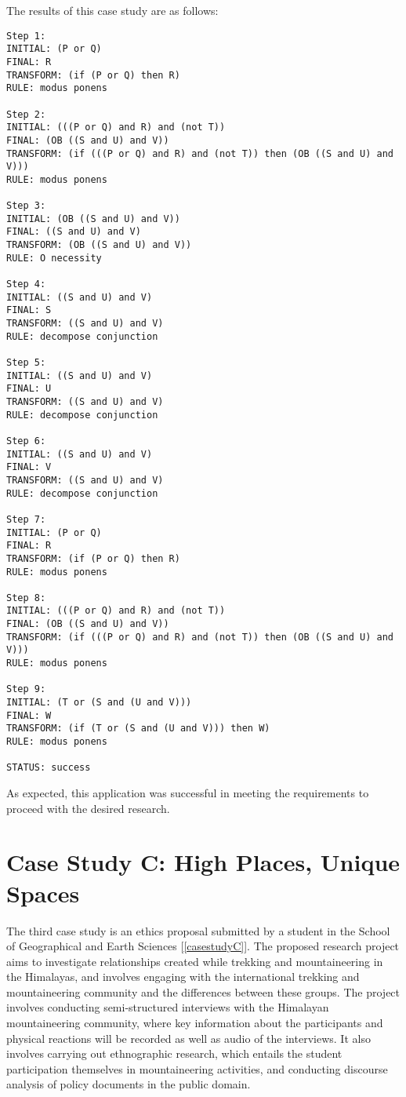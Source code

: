\documentclass{l4proj}
\begin{document}
The results of this case study are as follows: 
\begin{verbatim}
Step 1: 
INITIAL: (P or Q)
FINAL: R
TRANSFORM: (if (P or Q) then R)
RULE: modus ponens

Step 2: 
INITIAL: (((P or Q) and R) and (not T))
FINAL: (OB ((S and U) and V))
TRANSFORM: (if (((P or Q) and R) and (not T)) then (OB ((S and U) and V)))
RULE: modus ponens

Step 3: 
INITIAL: (OB ((S and U) and V))
FINAL: ((S and U) and V)
TRANSFORM: (OB ((S and U) and V))
RULE: O necessity

Step 4: 
INITIAL: ((S and U) and V)
FINAL: S
TRANSFORM: ((S and U) and V)
RULE: decompose conjunction

Step 5: 
INITIAL: ((S and U) and V)
FINAL: U
TRANSFORM: ((S and U) and V)
RULE: decompose conjunction

Step 6: 
INITIAL: ((S and U) and V)
FINAL: V
TRANSFORM: ((S and U) and V)
RULE: decompose conjunction

Step 7: 
INITIAL: (P or Q)
FINAL: R
TRANSFORM: (if (P or Q) then R)
RULE: modus ponens

Step 8: 
INITIAL: (((P or Q) and R) and (not T))
FINAL: (OB ((S and U) and V))
TRANSFORM: (if (((P or Q) and R) and (not T)) then (OB ((S and U) and V)))
RULE: modus ponens

Step 9: 
INITIAL: (T or (S and (U and V)))
FINAL: W
TRANSFORM: (if (T or (S and (U and V))) then W)
RULE: modus ponens

STATUS: success
\end{verbatim}
As expected, this application was successful in meeting the requirements to proceed with the desired research. 

\section{Case Study C: High Places, Unique Spaces}
The third case study is an ethics proposal submitted by a student in the School of Geographical and Earth Sciences [\ref{casestudyC}]. The proposed research project aims to investigate relationships created while trekking and mountaineering in the Himalayas, and involves engaging with the international trekking and mountaineering community and the differences between these groups. The project involves conducting semi-structured interviews with the Himalayan mountaineering community, where key information about the participants and physical reactions will be recorded as well as audio of the interviews. It also involves carrying out ethnographic research, which entails the student participation themselves in mountaineering activities, and conducting discourse analysis of policy documents in the public domain. 
\end{document}
